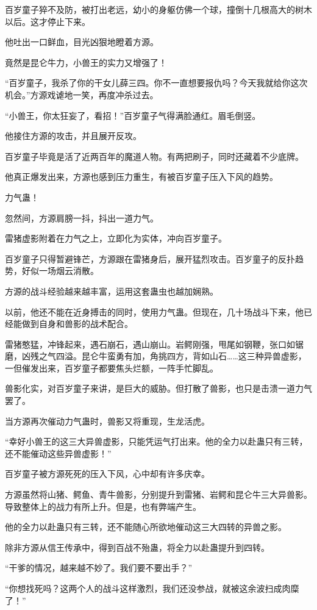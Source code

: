 \begin{this_body}
百岁童子猝不及防，被打出老远，幼小的身躯仿佛一个球，撞倒十几根高大的树木以后。这才停止下来。

他吐出一口鲜血，目光凶狠地瞪着方源。

竟然是昆仑牛力，小兽王的实力又增强了！

“百岁童子，我杀了你的干女儿薛三四。你不一直想要报仇吗？今天我就给你这次机会。”方源戏谑地一笑，再度冲杀过去。

“小兽王，你太狂妄了，看招！”百岁童子气得满脸通红。眉毛倒竖。

他接住方源的攻击，并且展开反攻。

百岁童子毕竟是活了近两百年的魔道人物。有两把刷子，同时还藏着不少底牌。

他真正爆发出来，方源也感到压力重生，有被百岁童子压入下风的趋势。

力气蛊！

忽然间，方源肩膀一抖，抖出一道力气。

雷猪虚影附着在力气之上，立即化为实体，冲向百岁童子。

百岁童子只得暂避锋芒，方源跟在雷猪身后，展开猛烈攻击。百岁童子的反扑趋势，好似一场烟云消散。

方源的战斗经验越来越丰富，运用这套蛊虫也越加娴熟。

以前，他还不能在近身搏击的同时，使用力气蛊。但现在，几十场战斗下来，他已经能做到自身和兽影的战术配合。

雷猪憨猛，冲锋起来，遇石崩石，遇山崩山。岩鳄刚强，甩尾如钢鞭，张口如锯磨，凶残之气四溢。昆仑牛蛮勇有加，角挑四方，背如山石……这三种异兽虚影，一但催发出来，百岁童子都要焦头烂额，一阵手忙脚乱。

兽影化实，对百岁童子来讲，是巨大的威胁。但打散了兽影，也只是击溃一道力气罢了。

当方源再次催动力气蛊时，兽影又将重现，生龙活虎。

“幸好小兽王的这三大异兽虚影，只能凭运气打出来。他的全力以赴蛊只有三转，还不能催动这些异兽虚影！”

百岁童子被方源死死的压入下风，心中却有许多庆幸。

方源虽然将山猪、鳄鱼、青牛兽影，分别提升到雷猪、岩鳄和昆仑牛三大异兽影。导致整体上的战力有所上升。但是，也有弊端产生。

他的全力以赴蛊只有三转，还不能随心所欲地催动这三大四转的异兽之影。

除非方源从信王传承中，得到百战不殆蛊，将全力以赴蛊提升到四转。

“干爹的情况，越来越不妙了。我们要不要出手？”

“你想找死吗？这两个人的战斗这样激烈，我们还没参战，就被这余波扫成肉糜了！”


\end{this_body}
